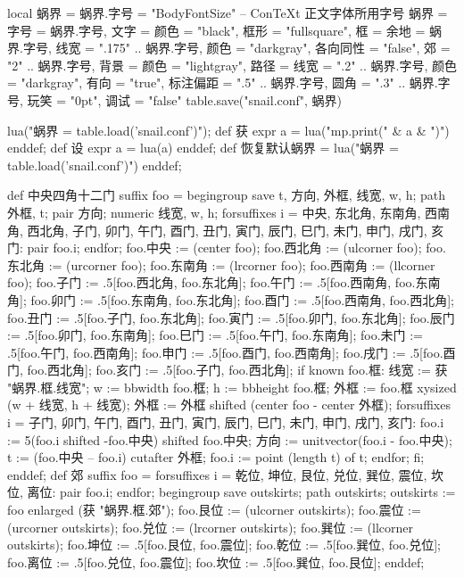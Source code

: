 \startluacode
local 蜗界 = {}
蜗界.字号 = "BodyFontSize" -- ConTeXt 正文字体所用字号
蜗界 = {
    字号 = 蜗界.字号,
    文字 = {颜色 = "black"},
    框形 = "fullsquare",
    框 = {余地 = 蜗界.字号,
          线宽 = ".175" .. 蜗界.字号,
          颜色 = "darkgray",
          各向同性 = "false",
          郊 = "2" .. 蜗界.字号},
    背景 = {颜色 = "lightgray"},
    路径 = {线宽 = ".2" .. 蜗界.字号,
            颜色 = "darkgray",
            有向 = "true",
            标注偏距 = ".5" .. 蜗界.字号,
            圆角 = ".3" .. 蜗界.字号},
    玩笑 = "0pt",
    调试 = "false"
}
table.save("snail.conf", 蜗界)
\stopluacode

\startMPinclusions
lua("蜗界 = table.load('snail.conf')");
def 获 expr a = lua("mp.print(" & a & ")") enddef;
def 设 expr a = lua(a) enddef;
def 恢复默认蜗界 =
  lua("蜗界 = table.load('snail.conf')")
enddef;
\stopMPinclusions

\startMPinclusions[+]
def 中央四角十二门 suffix foo = 
  begingroup
  save t, 方向, 外框, 线宽, w, h; path 外框, t; pair 方向; numeric 线宽, w, h;
  forsuffixes i = 中央, 东北角, 东南角, 西南角, 西北角,
                  子门, 卯门, 午门, 酉门,
                  丑门, 寅门, 辰门, 巳门, 未门, 申门, 戌门, 亥门:
    pair foo.i;
  endfor;
  foo.中央 := (center foo);
  foo.西北角 := (ulcorner foo); 
  foo.东北角 := (urcorner foo);
  foo.东南角 := (lrcorner foo);
  foo.西南角 := (llcorner foo);
  foo.子门 := .5[foo.西北角, foo.东北角];
  foo.午门 := .5[foo.西南角, foo.东南角];
  foo.卯门 := .5[foo.东南角, foo.东北角];
  foo.酉门 := .5[foo.西南角, foo.西北角];
  foo.丑门 := .5[foo.子门, foo.东北角];
  foo.寅门 := .5[foo.卯门, foo.东北角];
  foo.辰门 := .5[foo.卯门, foo.东南角];
  foo.巳门 := .5[foo.午门, foo.东南角];
  foo.未门 := .5[foo.午门, foo.西南角];
  foo.申门 := .5[foo.酉门, foo.西南角];
  foo.戌门 := .5[foo.酉门, foo.西北角];
  foo.亥门 := .5[foo.子门, foo.西北角];
  if known foo.框:
    线宽 := 获 "蜗界.框.线宽";
    w := bbwidth foo.框; h := bbheight foo.框;
    外框 := foo.框 xysized (w + 线宽, h + 线宽);
    外框 := 外框 shifted (center foo - center 外框);
    forsuffixes i = 子门, 卯门, 午门, 酉门,
                    丑门, 寅门, 辰门, 巳门, 未门, 申门, 戌门, 亥门:
      foo.i := 5(foo.i shifted -foo.中央) shifted foo.中央;
      方向 := unitvector(foo.i - foo.中央);
      t := (foo.中央 -- foo.i) cutafter 外框;
      foo.i := point (length t) of t;
    endfor;
  fi;
enddef;
def 郊 suffix foo = 
  forsuffixes i = 乾位, 坤位, 艮位, 兑位, 巽位, 震位, 坎位, 离位:
    pair foo.i;
  endfor;
  begingroup
    save outskirts; path outskirts;
  outskirts := foo enlarged (获 "蜗界.框.郊");
  foo.艮位 := (ulcorner outskirts); 
  foo.震位 := (urcorner outskirts);
  foo.兑位 := (lrcorner outskirts);
  foo.巽位 := (llcorner outskirts);
  foo.坤位 := .5[foo.艮位, foo.震位];
  foo.乾位 := .5[foo.巽位, foo.兑位];
  foo.离位 := .5[foo.兑位, foo.震位];
  foo.坎位 := .5[foo.巽位, foo.艮位];
enddef;

